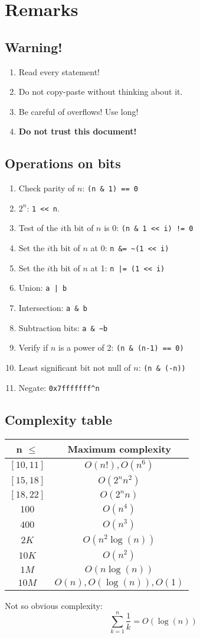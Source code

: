 \section{Remarks}
\subsection{Warning!}
\begin{enumerate}
	\item Read every statement!
	\item Do not copy-paste without thinking about it.
	\item Be careful of overflows! Use long!
	\item \textbf{Do not trust this document!}
\end{enumerate}
 
\subsection{Operations on bits}
\begin{enumerate}
	\item Check parity of $n$: \lstinline{(n & 1) == 0}
	\item $2^n$: \lstinline|1 << n|.
	\item Test of the $i$th bit of $n$ is $0$: \lstinline{(n & 1 << i) != 0}
	\item Set the $i$th bit of $n$ at 0: \lstinline{n &= ~(1 << i)}
	\item Set the $i$th bit of $n$ at 1: \lstinline{n |= (1 << i)}
	\item Union: \lstinline{a | b}
	\item Intersection: \lstinline{a & b}
	\item Subtraction bits: \lstinline{a & ~b}
	\item Verify if $n$ is a power of 2: \lstinline{(n & (n-1) == 0)}
	\item Least significant bit not null of $n$: \lstinline{(n & (-n))}
	\item Negate: \lstinline{0x7fffffff^n}
\end{enumerate}

\subsection{Complexity table}
\begin{center}
\begin{tabular}{|c|c|}
\hline
n $\leq$ & Maximum complexity\\
\hline
$[10,11]$ & $O(n!),O(n^6)$ \\
$[15,18]$ & $O(2^n n^2)$\\
$[18,22]$ & $O(2^n n)$\\
$100$ & $O(n^4)$\\
$400$ & $O(n^3)$\\
$2K$ & $O(n^2\log(n))$\\
$10K$ & $O(n^2)$\\
$1M$ & $O(n\log(n))$\\
$10M$ & $O(n),O(\log(n)),O(1)$\\
\hline
\end{tabular}
\end{center}
Not so obvious complexity:
$$\sum_{k=1}^n \frac{1}{k} = O(\log(n))$$

